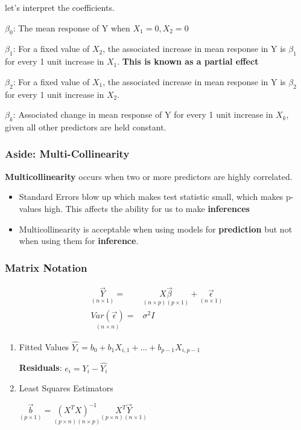 \documentclass[11pt]{article}
\begin{document}
let's interpret the coefficients.

\(\beta_0\): The mean response of Y when \(X_1 = 0, X_2 = 0\)

\(\beta_1\): For a fixed value of \(X_2\), the associated increase in mean response
in Y is \(\beta_1\) for every 1 unit increase in \(X_1\). \textbf{This is known as a
partial effect}

\(\beta_2\): For a fixed value of \(X_1\), the associated increase in mean response
in Y is \(\beta_2\) for every 1 unit increase in \(X_2\).

\(\beta_k\): Associated change in mean response of Y for every 1 unit increase in
\(X_k\), given all other predictors are held constant.

\subsubsection{Aside: Multi-Collinearity}
\label{sec:orgea917ca}
\textbf{Multicollinearity} occurs when two or more predictors are highly correlated.
\begin{itemize}
\item Standard Errors blow up which makes test statistic small, which makes p-values
high. This affects the ability for us to make \textbf{inferences}
\item Multicollinearity is acceptable when using models for \textbf{prediction} but not
when using them for \textbf{inference}.
\end{itemize}
\subsubsection{Matrix Notation}
\label{sec:orga441e05}
\begin{equation}
  \begin{split}
    \underset{(n \times 1)}{\vec{Y}} = & \underset{(n \times p)(p \times 1)}{X \vec{\beta}} + \underset{(n \times 1)}{\vec{\epsilon}}\\
    \underset{(n \times n)}{Var(\vec{\epsilon})} = & \sigma^2 I
  \end{split}
\end{equation}
\begin{enumerate}
\item Fitted Values
\label{sec:org83fac03}
\(\hat{Y_i} = b_0 + b_1 X_{i,1} + ... + b_{p - 1} X_{i, p - 1}\)

\textbf{Residuals}: \(e_i = Y_i - \hat{Y_i}\)

\item Least Squares Estimators
\label{sec:orge768073}

\(\underset{(p \times 1)}{\vec{b}} = \underset{(p \times n)(n \times p)}{(X^T X)^{-1}} \underset{(p \times n)(n \times 1)}{X^T \vec{Y}}\)
\end{enumerate}
\end{document}
